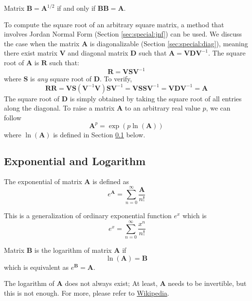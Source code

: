  \begin{definition}
 Matrix $\bm{B}=\bm{A}^{1/2}$ if and only if $\bm{BB}=\bm{A}$.
 \end{definition}
 To compute the square root of an arbitrary square matrix, a method that involves Jordan Normal Form (Section \ref{sec:special:jnf}) can be used. We discuss the case when the matrix $\bm{A}$ is diagonalizable (Section \ref{sec:special:diag}), meaning there exist matrix $\bm{V}$ and diagonal matrix $\bm{D}$ such that $\bm{A}=\bm{VDV}^{-1}$. The square root of $\bm{A}$ is $\bm{R}$ such that:
 \begin{equation}
     \bm{R}=\bm{VSV}^{-1}
 \end{equation}
 where $\bm{S}$ is \emph{any} square root of $\bm{D}$. To verify,
 \begin{equation}
     \bm{RR}=\bm{VS}(\bm{V}^{-1}\bm{V})\bm{SV}^{-1}=\bm{VSSV}^{-1}=\bm{VDV}^{-1}=\bm{A}
 \end{equation}
 The square root of $\bm{D}$ is simply obtained by taking the square root of all entries along the diagonal. To raise a matrix $\bm{A}$ to an arbitrary real value $p$, we can follow
 \begin{equation}
     \bm{A}^p=\exp(p\ln(\bm{A}))
 \end{equation}
 where $\ln(\bm{A})$ is defined in Section \ref{sec:malg:exp} below. 
 
 \subsection{Exponential and Logarithm}
 \label{sec:malg:exp}
 \begin{definition}
 The exponential of matrix $\bm{A}$ is defined as
    \begin{equation}
        e^{\bm{A}}=\sum_{n=0}^{\infty}\frac{\bm{A}}{n!}
    \end{equation}
 \end{definition}
 This is a generalization of ordinary exponential function $e^x$ which is
 \begin{equation}\
 e^x = \sum_{n=0}^{\infty}\frac{x^n}{n!}
 \end{equation}
 \begin{definition}
 Matrix $\bm{B}$ is the logarithm of matrix $\bm{A}$ if 
 \begin{equation}
     \ln(\bm{A})=\bm{B}
 \end{equation}
 which is equivalent as $e^{\bm{B}}=\bm{A}$.
 \end{definition}
 The logarithm of $\bm{A}$ does not always exist; At least, $\bm{A}$ needs to be invertible, but this is not enough. For more, please refer to \href{https://en.wikipedia.org/wiki/Logarithm_of_a_matrix}{Wikipedia}.
 
